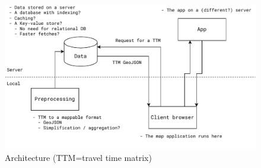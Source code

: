\begin{figure}[H]
	\centering
	\includegraphics[width=1\textwidth]{images/architechture}
	\caption{Architecture (TTM=travel time matrix)}
	\label{fig:architechture}
\end{figure}




